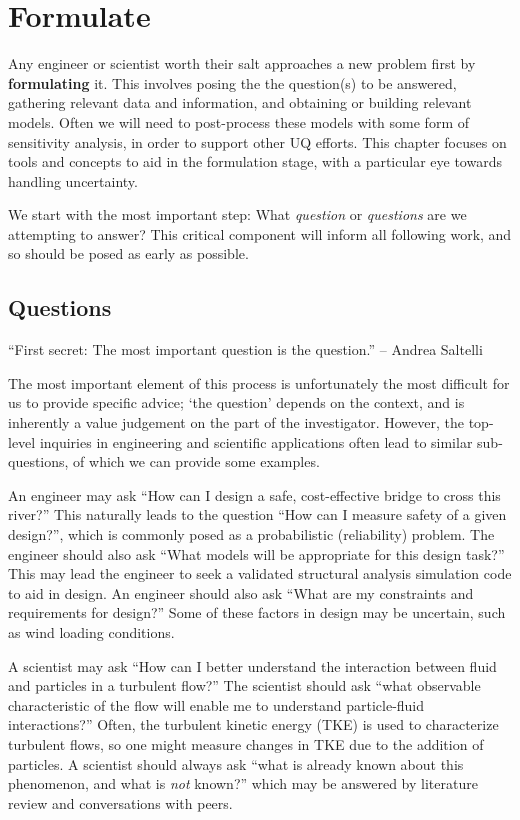 \documentclass[../primer.tex]{subfiles}
\begin{document}
\chapter{Formulate} \label{ch:formulate}
Any engineer or scientist worth their salt approaches a new problem first by
\textbf{formulating} it. This involves posing the the question(s) to be
answered, gathering relevant data and information, and obtaining or building
relevant models. Often we will need to post-process these models with some form
of sensitivity analysis, in order to support other UQ efforts. This chapter
focuses on tools and concepts to aid in the formulation stage, with a particular
eye towards handling uncertainty.

We start with the most important step: What \emph{question} or \emph{questions}
are we attempting to answer? This critical component will inform all following
work, and so should be posed as early as possible.

\section{Questions} \label{sec:questions}
``First secret: The most important question is the question.'' -- Andrea
Saltelli\cite{saltelli2000sensitivity}

The most important element of this process is unfortunately the most difficult
for us to provide specific advice; `the question' depends on the context, and is
inherently a value judgement on the part of the investigator. However, the
top-level inquiries in engineering and scientific applications often lead to
similar sub-questions, of which we can provide some examples.

An engineer may ask ``How can I design a safe, cost-effective bridge to cross
this river?'' This naturally leads to the question ``How can I measure safety of
a given design?'', which is commonly posed as a probabilistic (reliability)
problem. The engineer should also ask ``What models will be appropriate for this
design task?'' This may lead the engineer to seek a validated structural
analysis simulation code to aid in design. An engineer should also ask ``What
are my constraints and requirements for design?'' Some of these factors in
design may be uncertain, such as wind loading conditions.

A scientist may ask ``How can I better understand the interaction between fluid
and particles in a turbulent flow?'' The scientist should ask ``what observable
characteristic of the flow will enable me to understand particle-fluid
interactions?'' Often, the turbulent kinetic energy (TKE) is used to
characterize turbulent flows, so one might measure changes in TKE due to the
addition of particles. A scientist should always ask ``what is already known
about this phenomenon, and what is \emph{not} known?'' which may be answered by
literature review and conversations with peers.
\end{document}
